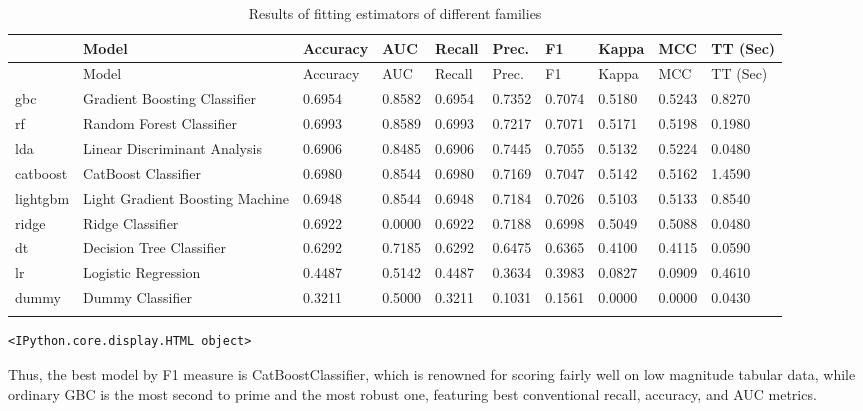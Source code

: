 \documentclass[
  letterpaper,
  DIV=11,
  numbers=noendperiod]{scrartcl}
\begin{document}
\hypertarget{tbl-leaderboard}{}
\begin{longtable}[]{@{}llllllllll@{}}
\toprule\noalign{}
~ & Model & Accuracy & AUC & Recall & Prec. & F1 & Kappa & MCC & TT
(Sec) \\
\midrule\noalign{}
\endfirsthead
\toprule\noalign{}
~ & Model & Accuracy & AUC & Recall & Prec. & F1 & Kappa & MCC & TT
(Sec) \\
\midrule\noalign{}
\endhead
\bottomrule\noalign{}
\endlastfoot
gbc & Gradient Boosting Classifier & 0.6954 & 0.8582 & 0.6954 & 0.7352 &
0.7074 & 0.5180 & 0.5243 & 0.8270 \\
rf & Random Forest Classifier & 0.6993 & 0.8589 & 0.6993 & 0.7217 &
0.7071 & 0.5171 & 0.5198 & 0.1980 \\
lda & Linear Discriminant Analysis & 0.6906 & 0.8485 & 0.6906 & 0.7445 &
0.7055 & 0.5132 & 0.5224 & 0.0480 \\
catboost & CatBoost Classifier & 0.6980 & 0.8544 & 0.6980 & 0.7169 &
0.7047 & 0.5142 & 0.5162 & 1.4590 \\
lightgbm & Light Gradient Boosting Machine & 0.6948 & 0.8544 & 0.6948 &
0.7184 & 0.7026 & 0.5103 & 0.5133 & 0.8540 \\
ridge & Ridge Classifier & 0.6922 & 0.0000 & 0.6922 & 0.7188 & 0.6998 &
0.5049 & 0.5088 & 0.0480 \\
dt & Decision Tree Classifier & 0.6292 & 0.7185 & 0.6292 & 0.6475 &
0.6365 & 0.4100 & 0.4115 & 0.0590 \\
lr & Logistic Regression & 0.4487 & 0.5142 & 0.4487 & 0.3634 & 0.3983 &
0.0827 & 0.0909 & 0.4610 \\
dummy & Dummy Classifier & 0.3211 & 0.5000 & 0.3211 & 0.1031 & 0.1561 &
0.0000 & 0.0000 & 0.0430 \\
\caption{\label{tbl-leaderboard}Results of fitting estimators of
different families}\label{T_dba7a}\tabularnewline
\end{longtable}

\begin{verbatim}
<IPython.core.display.HTML object>
\end{verbatim}

Thus, the best model by F1 measure is CatBoostClassifier, which is
renowned for scoring fairly well on low magnitude tabular data, while
ordinary GBC is the most second to prime and the most robust one,
featuring best conventional recall, accuracy, and AUC metrics.
\end{document}
